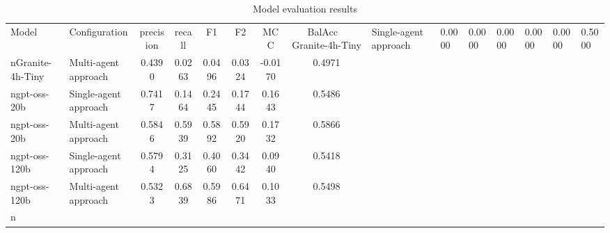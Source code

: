 \begin{table}[htbp]
\centering
\caption{Model evaluation results}
\label{tab:results}
\begin{tabular}{llcccccc}
\toprule
Model & Configuration & precision & recall & F1 & F2 & MCC & BalAcc \
\midrule
Granite-4h-Tiny & Single-agent approach & 0.0000 & 0.0000 & 0.0000 & 0.0000 & 0.0000 & 0.5000 \\nGranite-4h-Tiny & Multi-agent approach & 0.4390 & 0.0263 & 0.0496 & 0.0324 & -0.0170 & 0.4971 \\ngpt-oss-20b & Single-agent approach & 0.7417 & 0.1464 & 0.2445 & 0.1744 & 0.1643 & 0.5486 \\ngpt-oss-20b & Multi-agent approach & 0.5846 & 0.5939 & 0.5892 & 0.5920 & 0.1732 & 0.5866 \\ngpt-oss-120b & Single-agent approach & 0.5794 & 0.3125 & 0.4060 & 0.3442 & 0.0940 & 0.5418 \\ngpt-oss-120b & Multi-agent approach & 0.5323 & 0.6839 & 0.5986 & 0.6471 & 0.1033 & 0.5498 \\n\bottomrule
\end{tabular}
\end{table}
